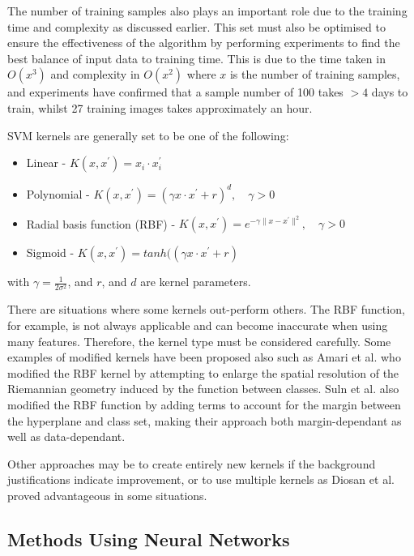 \documentclass[fleqn,twoside,12pt]{report}
\begin{document}
The number of training samples also plays an important role due to the training time and complexity as discussed earlier. This set must also be optimised to ensure the effectiveness of the algorithm by performing experiments to find the best balance of input data to training time. This is due to the time taken in $O(x^3)$ and complexity in $O(x^2)$ where $x$ is the number of training samples, and experiments have confirmed that a sample number of 100 takes $>4$ days to train, whilst 27 training images takes approximately an hour.  

SVM kernels are generally set to be one of the following:

\begin{itemize}
	\item Linear - $K(x, x^\prime) = x_i \cdot x_i^\prime$
	\item Polynomial - $K(x, x^\prime) = (\gamma x \cdot x^\prime + r) ^d, \quad \gamma > 0 \quad$
	\item Radial basis function (RBF) - $K(x, x^\prime) = e^{-\gamma\|x-x^\prime\|^2},  \quad \gamma > 0 \quad$
	\item Sigmoid - $K(x, x^\prime) = tanh((\gamma x \cdot x^\prime + r)$
\end{itemize}

with $\gamma = \frac{1}{2\sigma^2}$, and $r$, and $d$ are kernel parameters. 

There are situations where some kernels out-perform others. The RBF function, for example, is not always applicable and can become inaccurate when using many features. Therefore, the kernel type must be considered carefully. Some examples of modified kernels have been proposed also such as Amari et al.\cite{amari} who modified the RBF kernel by attempting to enlarge the spatial resolution of the Riemannian geometry induced by the function between classes. Suln et al.\cite{suln} also modified the RBF function by adding terms to account for the margin between the hyperplane and class set, making their approach both margin-dependant as well as data-dependant. 

Other approaches may be to create entirely new kernels if the background justifications indicate improvement, or to use multiple kernels as Diosan et al.\cite{diosan} proved advantageous in some situations.



\subsection{Methods Using Neural Networks}
\end{document}
